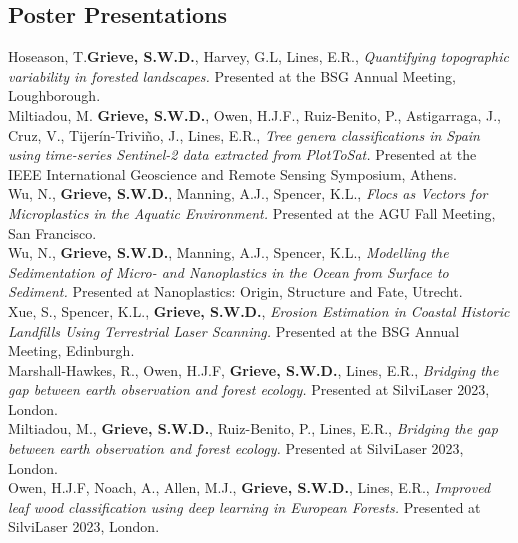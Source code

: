 \documentclass[10pt, a4paper]{article}
\newcommand{\student}{\textbf{\textsuperscript{\textdagger}}}
\newcommand{\years}[1]{\marginnote{\scriptsize #1}}
\begin{document}
\subsection*{Poster Presentations}

\years{2024} Hoseason, T.\student \textbf{Grieve, S.W.D.}, Harvey, G.L, Lines, E.R., \textit{Quantifying topographic variability in forested landscapes.} Presented at the BSG Annual Meeting, Loughborough.\\[0.05cm]

\years{2024} Miltiadou, M. \textbf{Grieve, S.W.D.}, Owen, H.J.F., Ruiz-Benito, P., Astigarraga, J., Cruz, V., Tijerín-Triviño, J., Lines, E.R., \textit{Tree genera classifications in Spain using time-series Sentinel-2 data extracted from PlotToSat.} Presented at the IEEE International Geoscience and Remote Sensing Symposium, Athens.\\[0.05cm]

\years{2023}Wu, N.\student, \textbf{Grieve, S.W.D.}, Manning, A.J., Spencer, K.L., \textit{
Flocs as Vectors for Microplastics in the Aquatic Environment.} Presented at the AGU Fall Meeting, San Francisco.\\[0.5cm]

\years{2023}Wu, N.\student, \textbf{Grieve, S.W.D.}, Manning, A.J., Spencer, K.L., \textit{Modelling the Sedimentation of Micro- and Nanoplastics in the Ocean from Surface to Sediment.} Presented at Nanoplastics: Origin, Structure and Fate, Utrecht.\\[0.05cm]

\years{2023}Xue, S.\student, Spencer, K.L., \textbf{Grieve, S.W.D.}, \textit{Erosion Estimation in Coastal Historic Landfills Using Terrestrial Laser Scanning.} Presented at the BSG Annual Meeting, Edinburgh.\\[0.05cm]

\years{2023}Marshall-Hawkes, R., Owen, H.J.F, \textbf{Grieve, S.W.D.}, Lines, E.R., \textit{Bridging the gap between earth observation and forest ecology.} Presented at SilviLaser 2023, London.\\[0.05cm]

\years{2023}Miltiadou, M., \textbf{Grieve, S.W.D.}, Ruiz-Benito, P., Lines, E.R., \textit{Bridging the gap between earth observation and forest ecology.} Presented at SilviLaser 2023, London.\\[0.05cm]

\years{2023}Owen, H.J.F, Noach, A., Allen, M.J.\student, \textbf{Grieve, S.W.D.}, Lines, E.R., \textit{Improved leaf wood classification using deep learning in European Forests.} Presented at SilviLaser 2023, London.\\[0.05cm]
\end{document}

